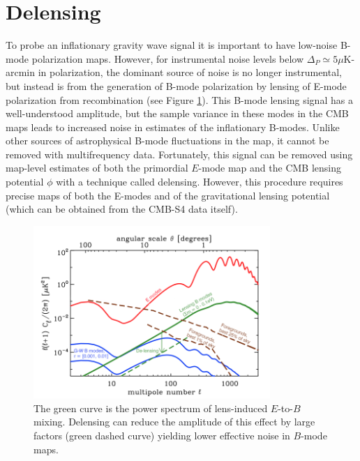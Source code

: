 


\section{Delensing}\label{delens}

To probe an inflationary gravity wave signal it is important to have low-noise B-mode polarization maps. However, for instrumental noise levels below $\Delta_P \simeq 5 \mu$K-arcmin in polarization, the dominant source of noise is no longer instrumental, but instead is from the generation of B-mode polarization
by lensing of E-mode polarization from recombination (see Figure \ref{snowmssDelens}).  This B-mode lensing signal has a well-understood amplitude, but the 
sample variance in these modes in the CMB maps leads to 
increased noise in estimates of the inflationary B-modes. Unlike other sources of astrophysical B-mode fluctuations in the map, it cannot be removed with multifrequency data.  Fortunately, this signal can be removed using map-level 
estimates of both the primordial $E$-mode map and the CMB lensing potential $\phi$ with a technique called delensing. However, this procedure requires
precise maps of both the E-modes and of the gravitational lensing potential
(which can be obtained from the CMB-S4 data itself).

\begin{figure}[htbp]
\centering
\includegraphics[width=0.80\textwidth]{CMBLensing/Delensing.png}
\caption{The green curve is the power spectrum of lens-induced $E$-to-$B$ mixing.  Delensing can reduce the amplitude of this effect by large factors (green dashed curve) yielding lower effective noise in $B$-mode maps.}
\label{snowmssDelens}
\end{figure}


